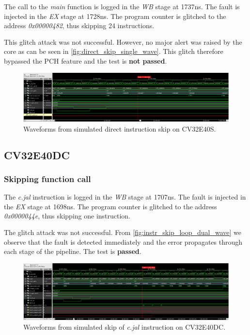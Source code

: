 The call to the \textit{main} function is logged in the \textit{WB} stage at 1737ns. The fault is injected in the \textit{EX} stage at 1728ns. The program counter is glitched to the address \textit{0x00000482}, thus skipping 24 instructions.

This glitch attack was not successful. However, no major alert was raised by the core as can be seen in \autoref{fig:direct_skip_single_wave}. This glitch therefore bypassed the PCH feature and the test is \textbf{not passed}.

\begin{figure}[h!]
    \centering
    \includegraphics[width=\textwidth]{docs/images/direct_skip_single_core.png}
    \caption{Waveforms from simulated direct instruction skip on CV32E40S.}
    \label{fig:direct_skip_single_wave}
\end{figure}

\subsection{CV32E40DC}
\label{subsec:dual_instr_skip}

\subsubsection{Skipping function call}

The \textit{c.jal} instruction is logged in the \textit{WB} stage at 1707ns. The fault is injected in the \textit{EX} stage at 1698ns. The program counter is glitched to the address \textit{0x0000044e}, thus skipping one instruction. 

The glitch attack was not successful. From \autoref{fig:instr_skip_loop_dual_wave} we observe that the fault is detected immediately and the error propagates through each stage of the pipeline. The test is \textbf{passed}.

\begin{figure}[h!]
    \centering
    \includegraphics[width=\textwidth]{docs/images/instr_skip_dual_core.png}
    \caption{Waveforms from simulated skip of \textit{c.jal} instruction on CV32E40DC.}
    \label{fig:instr_skip_dual_wave}
\end{figure}


